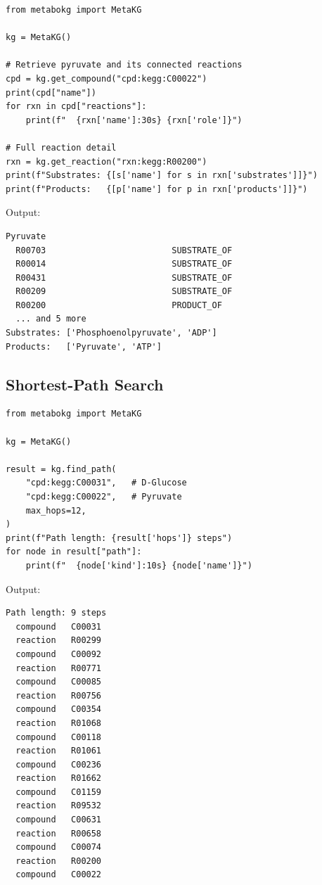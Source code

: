 \documentclass[10pt]{article}
\begin{document}
\begin{lstlisting}[style=python, caption={Compound retrieval and neighbourhood traversal.}]
from metabokg import MetaKG

kg = MetaKG()

# Retrieve pyruvate and its connected reactions
cpd = kg.get_compound("cpd:kegg:C00022")
print(cpd["name"])
for rxn in cpd["reactions"]:
    print(f"  {rxn['name']:30s} {rxn['role']}")

# Full reaction detail
rxn = kg.get_reaction("rxn:kegg:R00200")
print(f"Substrates: {[s['name'] for s in rxn['substrates']]}")
print(f"Products:   {[p['name'] for p in rxn['products']]}")
\end{lstlisting}

Output:
\begin{lstlisting}[style=bash, caption={}]
Pyruvate
  R00703                         SUBSTRATE_OF
  R00014                         SUBSTRATE_OF
  R00431                         SUBSTRATE_OF
  R00209                         SUBSTRATE_OF
  R00200                         PRODUCT_OF
  ... and 5 more
Substrates: ['Phosphoenolpyruvate', 'ADP']
Products:   ['Pyruvate', 'ATP']
\end{lstlisting}

\subsection{Shortest-Path Search}

\begin{lstlisting}[style=python, caption={Finding the shortest metabolic route between two compounds.}]
from metabokg import MetaKG

kg = MetaKG()

result = kg.find_path(
    "cpd:kegg:C00031",   # D-Glucose
    "cpd:kegg:C00022",   # Pyruvate
    max_hops=12,
)
print(f"Path length: {result['hops']} steps")
for node in result["path"]:
    print(f"  {node['kind']:10s} {node['name']}")
\end{lstlisting}

Output:
\begin{lstlisting}[style=bash, caption={}]
Path length: 9 steps
  compound   C00031
  reaction   R00299
  compound   C00092
  reaction   R00771
  compound   C00085
  reaction   R00756
  compound   C00354
  reaction   R01068
  compound   C00118
  reaction   R01061
  compound   C00236
  reaction   R01662
  compound   C01159
  reaction   R09532
  compound   C00631
  reaction   R00658
  compound   C00074
  reaction   R00200
  compound   C00022
\end{lstlisting}
\end{document}
